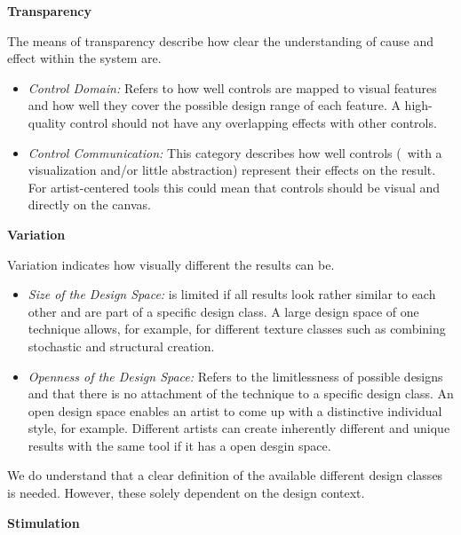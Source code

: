 \noindent\textbf{Transparency}
\label{subsubsec:transparency}

The means of transparency describe how clear the understanding of cause and effect within the system are.

\begin{itemize}
    \item \textit{Control Domain:} Refers to how well controls are mapped to visual features and how well they cover the possible design range of each feature. A high-quality control should not have any overlapping effects with other controls.
    \item \textit{Control Communication:} This category describes how well controls (\eg~with a visualization and/or little abstraction) represent their effects on the result. For artist-centered tools this could mean that controls should be visual and directly on the canvas.
\end{itemize}


\noindent\textbf{Variation}\label{subsubsec:variation}

Variation indicates how visually different the results can be.

\begin{itemize}
    \item \textit{Size of the Design Space:} is limited if all results look rather similar to each other and are part of a specific design class. A large design space of one technique allows, for example, for different texture classes such as combining stochastic and structural creation.
    \item \textit{Openness of the Design Space:} Refers to the limitlessness of possible designs and that there is no attachment of the technique to a specific design class. An open design space enables an artist to come up with a distinctive individual style, for example. Different artists can create inherently different and unique results with the same tool if it has a open desgin space.
\end{itemize}

We do understand that a clear definition of the available different design classes is needed. However, these solely dependent on the design context. 


\noindent\textbf{Stimulation}
\label{subsubsec:stimulation}

